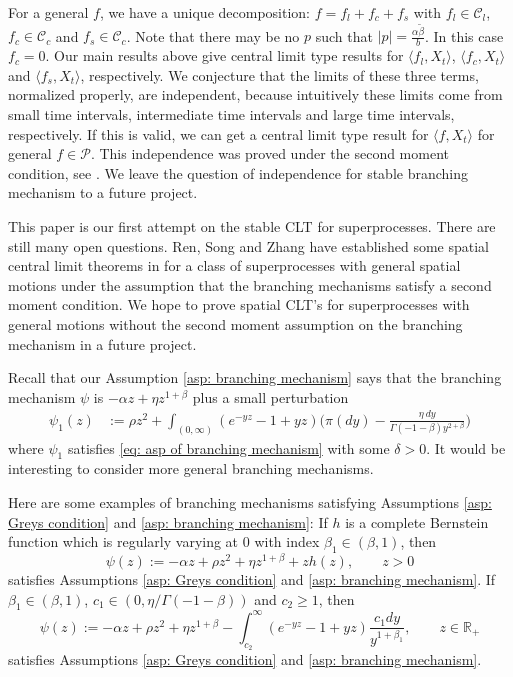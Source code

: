 \documentclass[12pt,a4paper]{amsart}
\theoremstyle{plain}
\theoremstyle{definition}
\numberwithin{equation}{section}
\begin{document}
For a general $f$, we have a unique decomposition: $f=f_l+f_c+f_s$ with $f_l\in\mathcal C_l$, $f_c\in\mathcal C_c$ and $f_s\in\mathcal C_c$.
Note that there may be no $p$ such that $|p|=\frac{\alpha \tilde\beta}{b}$. In this case $f_c=0$.
Our main results above give central limit type results for $\langle f_l, X_t\rangle$, $\langle f_c, X_t\rangle$ and $\langle f_s, X_t\rangle$, respectively.
We conjecture that the limits of these three terms, normalized properly, are independent, because intuitively these limits come from small time intervals, intermediate time intervals and large time intervals, respectively.
If this is valid, we can get a central limit type result for $\langle f, X_t\rangle$ for general $f\in\mathcal{P}$.
This independence was proved under the second moment condition, see \cite{RenSongZhang2015Central}.
We leave the question of independence for stable branching mechanism to a future project.

This paper is our first attempt on the stable CLT for superprocesses.
There are still many open questions.
Ren, Song and Zhang have established some spatial  central limit theorems in \cite{RenSongZhang2015Central} for a class of superprocesses with general spatial motions under the assumption that the branching mechanisms satisfy a second moment condition.
We hope to prove spatial CLT's for superprocesses with general motions without the second moment assumption on the branching mechanism in a future project.


Recall that our Assumption \ref{asp: branching mechanism} says that the branching mechanism $\psi$ is $-\alpha z +\eta z^{1+\beta}$ plus a small perturbation
\begin{align}
  \label{eq: psi 1}
	\psi_1(z)
	& := \rho z^2+ \int_{(0,\infty)}(e^{-yz}-1+yz) \Big(\pi(dy) - \frac{\eta~dy}{\Gamma(-1-\beta) y^{2+\beta}}\Big)
\end{align}
where $\psi_1$ satisfies \eqref{eq: asp of branching mechanism} with some $\delta>0$.
It would be interesting to consider more general branching mechanisms.

Here are some examples of branching mechanisms satisfying Assumptions \ref{asp: Greys condition} and \ref{asp: branching mechanism}:
If $h$ is a complete Bernstein function which is regularly varying at 0 with index $\beta_1\in (\beta, 1)$, then
\[
  \psi(z)
  := -\alpha z + \rho z^2+\eta z^{1+\beta}+zh(z)
  , \qquad z>0
\]
satisfies Assumptions \ref{asp: Greys condition} and \ref{asp: branching mechanism}.
If $\beta_1\in (\beta, 1)$, $c_1\in (0, \eta/\Gamma(-1-\beta))$ and $c_2\ge 1$, then
\[
  \psi(z)
  :=-\alpha z + \rho z^2+\eta z^{1+\beta}-\int^\infty_{c_2} (e^{-yz}-1+yz)\frac{c_1dy}{y^{1+\beta_1}}
  , \qquad z\in \mathbb R_+
\]
satisfies Assumptions \ref{asp: Greys condition} and \ref{asp: branching mechanism}.
\end{document}
